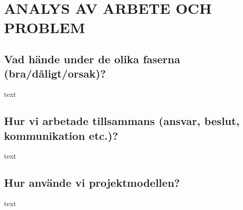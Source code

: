 \documentclass[efterstudie/studie.tex]{subfiles}
\begin{document}
\section{ANALYS AV ARBETE OCH PROBLEM}
\subsection{Vad hände under de olika faserna (bra/dåligt/orsak)?}
text
\subsection{Hur vi arbetade tillsammans (ansvar, beslut, kommunikation etc.)?}
text
\subsection{Hur använde vi projektmodellen?}
text
\end{document}
